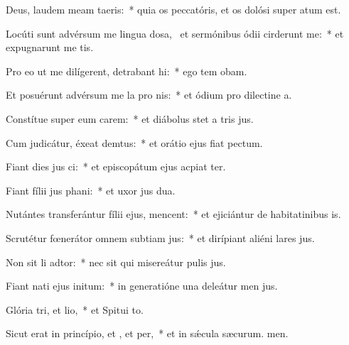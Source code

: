 \item Deus, laudem meam  taeris:~* quia os peccatóris, et os dolósi super  atum est.
\item Locúti sunt advérsum me lingua dosa,~\pscross{} et sermónibus ódii cirderunt me:~* et expugnarunt me tis.
\item Pro eo ut me dilígerent, detrabant hi:~* ego tem obam.
\item Et posuérunt advérsum me la pro nis:~* et ódium pro dilectine a.
\item Constítue super eum carem:~* et diábolus stet a tris jus.
\item Cum judicátur, éxeat demtus:~* et orátio ejus fiat  pectum.
\item Fiant dies jus ci:~* et episcopátum ejus acpiat ter.
\item Fiant fílii jus phani:~* et uxor jus dua.
\item Nutántes transferántur fílii ejus,  mencent:~* et ejiciántur de habitatinibus is.
\item Scrutétur fœnerátor omnem subtiam jus:~* et dirípiant aliéni lares jus.
\item Non sit li adtor:~* nec sit qui misereátur pulis jus.
\item Fiant nati ejus  initum:~* in generatióne una deleátur men jus.
\item Glória tri, et lio,~* et Spitui to.
\item Sicut erat in princípio, et , et per,~* et in sǽcula sæcurum. men.
